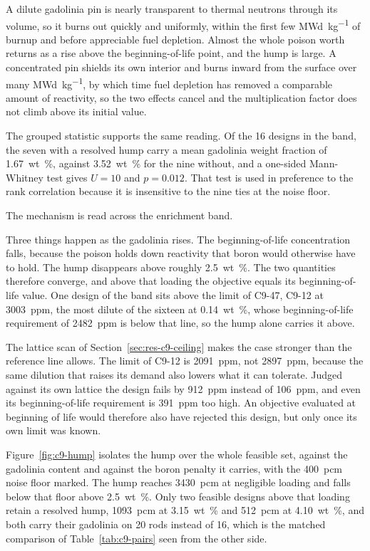 A dilute gadolinia pin is nearly transparent to thermal neutrons through
its volume, so it burns out quickly and uniformly, within the first few
\si{MWd\per kg} of burnup and before appreciable fuel depletion. Almost the
whole poison worth returns as a rise above the beginning-of-life point, and
the hump is large. A concentrated pin shields its own interior and burns
inward from the surface over many \si{MWd\per kg}, by which time fuel
depletion has removed a comparable amount of reactivity, so the two effects
cancel and the multiplication factor does not climb above its initial
value.

The grouped statistic supports the same reading. Of the 16 designs in the
band, the seven with a resolved hump carry a mean gadolinia weight fraction
of \SI{1.67}{wt\%}, against \SI{3.52}{wt\%} for the nine without, and a
one-sided Mann-Whitney test gives $U = 10$ and $p = 0.012$. That test is
used in preference to the rank correlation because it is insensitive to the
nine ties at the noise floor.

The mechanism is read across the enrichment band.

Three things happen as the gadolinia rises. The beginning-of-life
concentration falls, because the poison holds down reactivity that boron
would otherwise have to hold. The hump disappears above roughly
\SI{2.5}{wt\%}. The two quantities therefore converge, and above that
loading the objective equals its beginning-of-life value. One design of
the band sits above the limit of C9-47, C9-12 at \SI{3003}{ppm}, the
most dilute of the sixteen at \SI{0.14}{wt\%}, whose beginning-of-life
requirement of \SI{2482}{ppm} is below that line, so the hump alone
carries it above.

The lattice scan of Section~\ref{sec:res-c9-ceiling} makes the case stronger
than the reference line allows. The limit of C9-12 is \SI{2091}{ppm}, not
\SI{2897}{ppm}, because the same dilution that raises its demand also lowers
what it can tolerate. Judged against its own lattice the design fails by
\SI{912}{ppm} instead of \SI{106}{ppm}, and even its beginning-of-life
requirement is \SI{391}{ppm} too high. An objective evaluated at beginning
of life would therefore also have rejected this design, but only once its
own limit was known.

Figure~\ref{fig:c9-hump} isolates the hump over the whole feasible set,
against the gadolinia content and against the boron penalty it carries,
with the \SI{400}{pcm} noise floor marked. The hump reaches
\SI{3430}{pcm} at negligible loading and falls below that floor above
\SI{2.5}{wt\%}. Only two feasible designs above that loading retain a
resolved hump, \SI{1093}{pcm} at \SI{3.15}{wt\%} and \SI{512}{pcm} at
\SI{4.10}{wt\%}, and both carry their gadolinia on 20 rods instead of
16, which is the matched comparison of Table~\ref{tab:c9-pairs} seen
from the other side.

